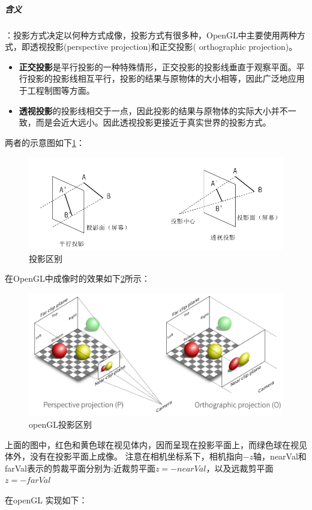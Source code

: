 \documentclass[UTF8,a4paper,12pt]{ctexbook}
\begin{document}
			\subparagraph{含义}：投影方式决定以何种方式成像，投影方式有很多种，OpenGL中主要使用两种方式，即透视投影(perspective projection)和正交投影( orthographic projection)。
			\begin{itemize}[itemindent = 1em]
				\item \textbf{正交投影}是平行投影的一种特殊情形，正交投影的投影线垂直于观察平面。平行投影的投影线相互平行，投影的结果与原物体的大小相等，因此广泛地应用于工程制图等方面。 
				\item \textbf{透视投影}的投影线相交于一点，因此投影的结果与原物体的实际大小并不一致，而是会近大远小。因此透视投影更接近于真实世界的投影方式。
			\end{itemize}
			两者的示意图如下\ref{tyqb}：
			\begin{figure}[H]
				\centering
				\includegraphics[width=.8\linewidth]{project.png}
				\caption{投影区别}
				\label{tyqb}
			\end{figure}
			在OpenGL中成像时的效果如下\ref{touyingqubie}所示：
			   \begin{figure}[H]
			   	\centering
			   	\includegraphics[width=.8\linewidth]{project2.png}
			   	\caption{openGL投影区别}
			   	\label{touyingqubie}
			   \end{figure}
			上面的图中，红色和黄色球在视见体内，因而呈现在投影平面上，而绿色球在视见体外，没有在投影平面上成像。  注意在相机坐标系下，相机指向$-z$轴，nearVal和farVal表示的剪裁平面分别为:近裁剪平面$z=−nearVal$，以及远裁剪平面$z=−farVal$ 
			
			在openGL 实现如下：
			
\end{document}
